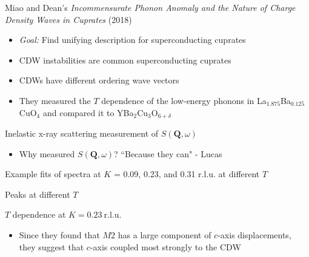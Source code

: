 \documentclass{beamer}
\newcommand*\vf[1]{\mathbf{#1}}
\begin{document}
\begin{frame}{Miao and Dean's \textit{Incommensurate Phonon Anomaly and the Nature of Charge Density Waves in Cuprates} (2018)}
\begin{itemize}
\item \textit{Goal:} Find unifying description for superconducting cuprates
\item CDW instabilities are common superconducting cuprates
\item CDWs have different ordering wave vectors
\item They measured the $T$ dependence of the low-energy phonons in La$_{1.875}$Ba$_{0.125}$CuO$_4$ and compared it to YBa$_2$Cu$_3$O$_{6 + \delta}$
\end{itemize}
\end{frame}

\begin{frame}{Inelastic x-ray scattering measurement of $S(\vf{Q}, \omega)$}
\begin{itemize}
\item Why measured $S(\vf{Q}, \omega)$? ``Because they can" - Lucas
\end{itemize}
\end{frame}

\begin{frame}{Example fits of spectra at $K$ = 0.09, 0.23, and 0.31 r.l.u. at different $T$}
\end{frame}

\begin{frame}{Peaks at different $T$}
\end{frame}

\begin{frame}{$T$ dependence at $K = 0.23~\mathrm{r.l.u.}$}
\begin{itemize}
\item Since they found that $M2$ has a large component of $c$-axis displacements, they suggest that $c$-axis coupled most strongly to the CDW
\end{itemize}
\end{frame}
\end{document}
